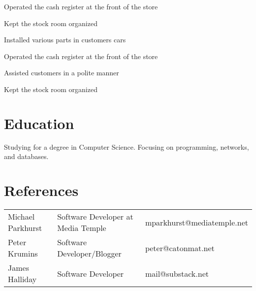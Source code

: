 \documentclass[table,tmargin=1in,bmargin=1in,letterpaper]{resume}
\begin{document}
\begin{compactitem}
  \item Operated the cash register at the front of the store
  \item Kept the stock room organized
  \item Installed various parts in customers cars
\end{compactitem}

\begin{compactitem}  
  \item Operated the cash register at the front of the store
  \item Assisted customers in a polite manner
  \item Kept the stock room organized
\end{compactitem}

\section{Education}

\begin{compactitem}
\item Studying for a degree in Computer Science.  Focusing on programming, networks, and databases.
\end{compactitem}

\section{References}
\begin{tabular}{lll}
\rowcolor{white} Michael Parkhurst & Software Developer at Media Temple & mparkhurst@mediatemple.net \\
\rowcolor{lightgray} Peter Krumins & Software Developer/Blogger & peter@catonmat.net \\
\rowcolor{white} James Halliday & Software Developer & mail@substack.net
\end{tabular}
\end{document}

